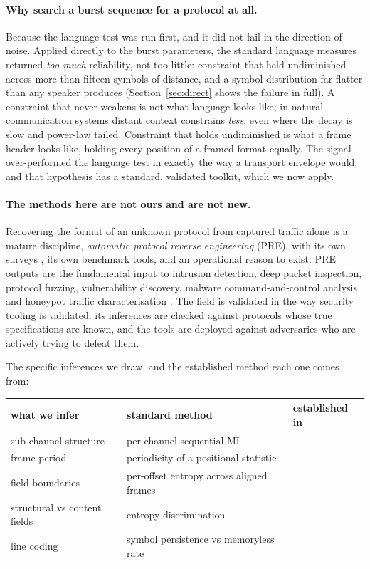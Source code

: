 \documentclass[11pt,a4paper]{article}
\begin{document}
\paragraph{Why search a burst sequence for a protocol at all.} Because the language
test was run first, and it did not fail in the direction of noise. Applied directly to
the burst parameters, the standard language measures returned \emph{too much}
reliability, not too little: constraint that held undiminished across more than fifteen
symbols of distance, and a symbol distribution far flatter than any speaker produces
(Section~\ref{sec:direct} shows the failure in full). A constraint that never weakens
is not what language looks like; in natural communication systems distant context
constrains \emph{less}, even where the decay is slow and power-law tailed. Constraint
that holds undiminished is what a frame header looks like, holding every
position of a framed format equally. The signal over-performed the language test in
exactly the way a transport envelope would, and that hypothesis has a standard,
validated toolkit, which we now apply.

\paragraph{The methods here are not ours and are not new.} Recovering the format of an
unknown protocol from captured traffic alone is a mature discipline, \emph{automatic
protocol reverse engineering} (PRE), with its own surveys \cite{sija2018,kleber2019,
duchene2018}, its own benchmark tools, and an operational reason to exist. PRE outputs
are the fundamental input to intrusion detection, deep packet inspection, protocol
fuzzing, vulnerability discovery, malware command-and-control analysis and honeypot
traffic characterisation \cite{sija2018,duchene2018}. The field is validated in the way
security tooling is validated: its inferences are checked against protocols whose true
specifications are known, and the tools are deployed against adversaries who are
actively trying to defeat them.

The specific inferences we draw, and the established method each one comes from:

\begin{center}
\small
\begin{tabular}{lll}
\toprule
what we infer & standard method & established in \\
\midrule
sub-channel structure & per-channel sequential MI & \cite{sija2018} \\
frame period & periodicity of a positional statistic & \cite{kleber2019} \\
field boundaries & per-offset entropy across aligned frames & \cite{kleber2019,bossert2014} \\
structural vs content fields & entropy discrimination & \cite{lyda2007,dorfinger2011} \\
line coding & symbol persistence vs memoryless rate & \cite{proakis2008} \\
\bottomrule
\end{tabular}
\end{center}
\end{document}
